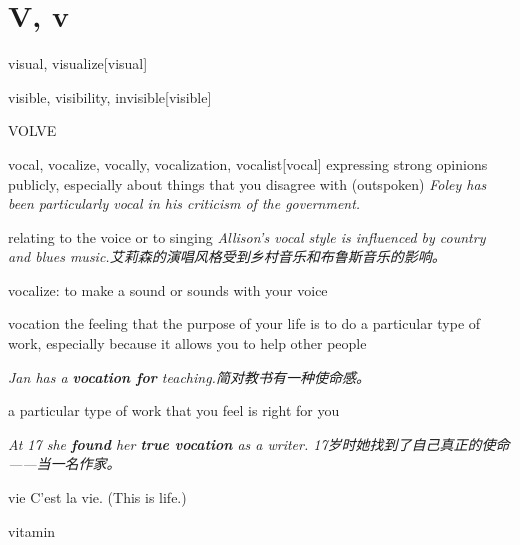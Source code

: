 \section{V, v}

\begin{DefWord}{visual, visualize}[visual]
\end{DefWord}

\begin{DefWord}{visible, visibility, invisible}[visible]
\end{DefWord}

\begin{DefWord}{VOLVE}
\end{DefWord}

\begin{DefWord}{vocal, vocalize, vocally, vocalization, vocalist}[vocal]
    expressing strong opinions publicly, especially about things that you disagree with (outspoken)
    \textit{Foley has been particularly vocal in his criticism of the government.}

    relating to the voice or to singing
    \textit{Allison's vocal style is influenced by country and blues music.艾莉森的演唱风格受到乡村音乐和布鲁斯音乐的影响。 }

    vocalize: to make a sound or sounds with your voice
\end{DefWord}

\begin{DefWord}{vocation}
    the feeling that the purpose of your life is to do a particular type of work, especially because it allows you to help other people

    \textit{Jan has a \textbf{vocation for} teaching.简对教书有一种使命感。 }

    a particular type of work that you feel is right for you

    \textit{At 17 she \textbf{found} her \textbf{true vocation} as a writer. 17岁时她找到了自己真正的使命——当一名作家。 }
\end{DefWord}

\begin{DefWord}{vie}
    C'est la vie. (This is life.)
\end{DefWord}

\begin{DefWord}{vitamin}
\end{DefWord}

